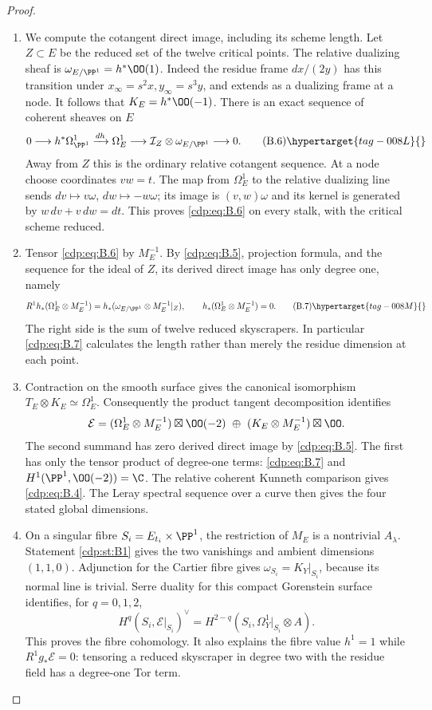 \begin{proof}
\begin{enumerate}[label={$\langle1\rangle$\arabic*.},leftmargin=*]
\item We compute the cotangent direct image, including its scheme length. Let $Z\subset E$ be the reduced set of the twelve critical points. The relative dualizing sheaf is $\omega_{E/\PP^1}=h^*\OO(1)$. Indeed the residue frame $dx/(2y)$ has this transition under $x_\infty=s^2x,y_\infty=s^3y$, and extends as a dualizing frame at a node. It follows that $K_E=h^*\OO(-1)$. There is an exact sequence of coherent sheaves on $E$
\[
0\longrightarrow h^*\Omega^1_{\PP^1}
 \xrightarrow{dh}\Omega^1_E
 \longrightarrow\mathcal I_Z\otimes\omega_{E/\PP^1}
 \longrightarrow0.                                   \tag{B.6}\hypertarget{tag-008L}{}\label{cdp:eq:B.6}
\]
Away from $Z$ this is the ordinary relative cotangent sequence. At a node choose coordinates $vw=t$. The map from $\Omega^1_E$ to the relative dualizing line sends $dv\mapsto v\omega$, $dw\mapsto-w\omega$; its image is $(v,w)\omega$ and its kernel is generated by $w\,dv+v\,dw=dt$. This proves \eqref{cdp:eq:B.6} on every stalk, with the critical scheme reduced.

\item Tensor \eqref{cdp:eq:B.6} by $M_E^{-1}$. By \eqref{cdp:eq:B.5}, projection formula, and the sequence for the ideal of $Z$, its derived direct image has only degree one, namely
\[
 R^1h_*(\Omega^1_E\otimes M_E^{-1})
 =h_*(\omega_{E/\PP^1}\otimes M_E^{-1}|_Z),
 \qquad h_*(\Omega^1_E\otimes M_E^{-1})=0.             \tag{B.7}\hypertarget{tag-008M}{}\label{cdp:eq:B.7}
\]
The right side is the sum of twelve reduced skyscrapers. In particular \eqref{cdp:eq:B.7} calculates the length rather than merely the residue dimension at each point.

\item Contraction on the smooth surface gives the canonical isomorphism $T_E\otimes K_E\simeq\Omega^1_E$. Consequently the product tangent decomposition identifies
\[
\mathcal E=(\Omega^1_E\otimes M_E^{-1})\boxtimes\OO(-2)
 \ \oplus\ (K_E\otimes M_E^{-1})\boxtimes\OO.
\]
The second summand has zero derived direct image by \eqref{cdp:eq:B.5}. The first has only the tensor product of degree-one terms: \eqref{cdp:eq:B.7} and $H^1(\PP^1,\OO(-2))=\C$. The relative coherent Kunneth comparison gives \eqref{cdp:eq:B.4}. The Leray spectral sequence over a curve then gives the four stated global dimensions.

\item On a singular fibre $S_i=E_{t_i}\times\PP^1$, the restriction of $M_E$ is a nontrivial $A_\lambda$. Statement \ref{cdp:st:B1} gives the two vanishings and ambient dimensions $(1,1,0)$. Adjunction for the Cartier fibre gives $\omega_{S_i}=K_Y|_{S_i}$, because its normal line is trivial. Serre duality for this compact Gorenstein surface identifies, for $q=0,1,2$,
\[
 H^q(S_i,\mathcal E|_{S_i})^\vee
 =H^{2-q}(S_i,\Omega_Y^1|_{S_i}\otimes A).
\]
This proves the fibre cohomology. It also explains the fibre value $h^1=1$ while $R^1g_*\mathcal E=0$: tensoring a reduced skyscraper in degree two with the residue field has a degree-one Tor term.

\end{enumerate}
\end{proof}
